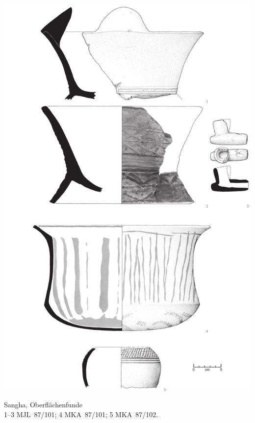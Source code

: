 \begin{pl}[H]
	\includegraphics{plt/Taf39.pdf}
	\vspace{.75em}\caption{\mbox{Sangha}, Oberflächenfunde \\ 1--3 MJL~87/101; 4 MKA~87/101; 5 MKA~87/102.}
	\label{pl:39}
\end{pl}

